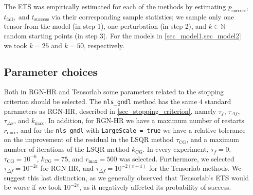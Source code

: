 \documentclass[a4paper,10pt,final]{siamart1116}
\newcommand{\refsec}[1]{{\cref{#1}}}
\numberwithin{equation}{section}
\numberwithin{figure}{section}
\numberwithin{table}{section}
\numberwithin{theorem}{section}
\begin{document}
The ETS was {empirically} estimated for each of the methods by estimating $p_{\mathrm{success}}$, {$t_{\text{fail}},$ and $t_{\mathrm{success}}$} via their corresponding sample statistics; we sample only one tensor from the model (in step 1), one perturbation (in step 2), and $k \in \mathbb{N}$ random starting points (in step 3). For the models in \cref{sec_model1,sec_model2} we took $k = 25$ and $k = 50$, respectively.

\subsection{Parameter choices}
Both in RGN-HR and Tensorlab some parameters related to the stopping criterion should be selected. The \verb|nls_gndl| method has the same $4$ standard parameters as RGN-HR, described in \refsec{sec_stopping_criterion}, namely $\tau_f$, $\tau_{\Delta f}$, $\tau_{\Delta x}$, and $k_{\max}$. In addition, for RGN-HR we have a maximum number of restarts $r_{\max}$, and for the \verb|nls_gndl| with \verb|LargeScale = true| we have a relative tolerance on the improvement of the residual in the LSQR method $\tau_{\text{CG}}$, and a maximum number of iterations of the LSQR method $k_{\text{CG}}$.
In every experiment, $\tau_f = 0$, $\tau_{\text{CG}} = 10^{-6}$, $k_{\text{CG}} = 75$, and $r_{\max} = 500$ was selected. Furthermore, we selected $\tau_{\Delta f} = 10^{-2e}$ for RGN-HR, and $\tau_{\Delta f} = 10^{-2(e+1)}$ for the Tensorlab methods. We suggest this last distinction, as we generally observed that Tensorlab's ETS would be worse if we took $10^{-2e}$, as it negatively affected its probability of success.
\end{document}
